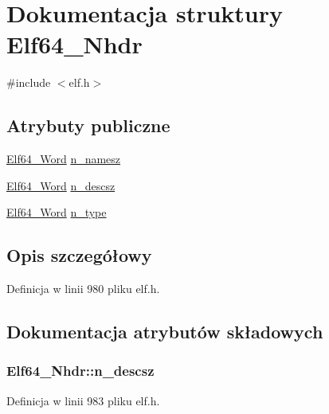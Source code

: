 \hypertarget{struct_elf64___nhdr}{\section{Dokumentacja struktury Elf64\-\_\-\-Nhdr}
\label{struct_elf64___nhdr}
}


{\ttfamily \#include $<$elf.\-h$>$}

\subsection*{Atrybuty publiczne}
\begin{DoxyCompactItemize}
\item 
\hyperlink{elf_8h_aa3aa1920ed115b7ef7e99716fece4401}{Elf64\-\_\-\-Word} \hyperlink{struct_elf64___nhdr_a1169a3f8272ba5265ea3aecdc4974546}{n\-\_\-namesz}
\item 
\hyperlink{elf_8h_aa3aa1920ed115b7ef7e99716fece4401}{Elf64\-\_\-\-Word} \hyperlink{struct_elf64___nhdr_ace700cd855c773a6483e247f18a33350}{n\-\_\-descsz}
\item 
\hyperlink{elf_8h_aa3aa1920ed115b7ef7e99716fece4401}{Elf64\-\_\-\-Word} \hyperlink{struct_elf64___nhdr_abbb820712cc219d235bb7eb3c11eefbe}{n\-\_\-type}
\end{DoxyCompactItemize}


\subsection{Opis szczegółowy}


Definicja w linii 980 pliku elf.\-h.



\subsection{Dokumentacja atrybutów składowych}
\hypertarget{struct_elf64___nhdr_ace700cd855c773a6483e247f18a33350}{
\subsubsection[{n\-\_\-descsz}]{ Elf64\-\_\-\-Nhdr\-::n\-\_\-descsz}}\label{struct_elf64___nhdr_ace700cd855c773a6483e247f18a33350}


Definicja w linii 983 pliku elf.\-h.


